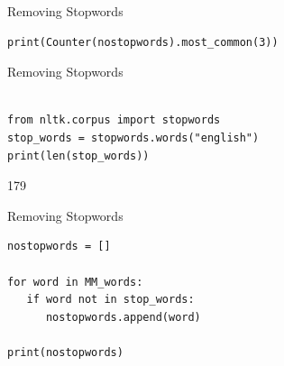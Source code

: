 \documentclass[handout]{beamer}
\begin{document}
\begin{frame}[fragile]{Removing Stopwords}
	
\begin{lstlisting}		
print(Counter(nostopwords).most_common(3))
\end{lstlisting}

\begin{lstlistingoutput}
[(',', 17), ('alive', 6), ('.', 2)]
\end{lstlistingoutput}
	
	
\end{frame}



\begin{frame}[fragile]{Removing Stopwords}
	
\begin{lstlisting}		

from nltk.corpus import stopwords
stop_words = stopwords.words("english")
print(len(stop_words))
\end{lstlisting}
	
\begin{lstlistingoutput}
179
\end{lstlistingoutput}

\end{frame}



\begin{frame}[fragile]{Removing Stopwords}
	
\begin{lstlisting}		
nostopwords = []

for word in MM_words:
   if word not in stop_words:
      nostopwords.append(word)

print(nostopwords)
\end{lstlisting}
	
\begin{lstlistingoutput}
\end{lstlistingoutput}
	
\end{frame}
\end{document}
